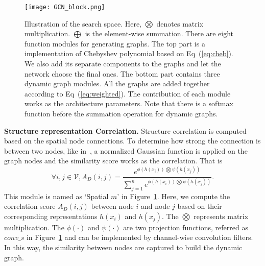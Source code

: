\documentclass[letterpaper]{article} \usepackage{aaai19}  \usepackage{times}  \usepackage{helvet} \usepackage{courier}  \usepackage[hyphens]{url}  \usepackage{graphicx} \urlstyle{rm} \def\UrlFont{\rm}  \usepackage{graphicx}  \frenchspacing  \setlength{\pdfpagewidth}{8.5in}  \setlength{\pdfpageheight}{11in}
\begin{document}
\begin{figure}[thbp!]
\centering
\texttt{[image: GCN\_block.png]}
\caption{\small{ Illustration of the search space. Here, $\bigotimes$ denotes matrix multiplication. $\bigoplus$ is the element-wise summation. There are eight function modules for generating graphs. The top part is a implementation of Chebyshev polynomial based on Eq~(\ref{eq:cheb}). We also add its separate components to the graphs and let the network choose the final ones. The bottom part contains three dynamic graph modules. All the graphs are added together according to Eq~(\ref{eq:weighted}). The contribution of each module works as the architecture parameters. Note that there is a softmax function before the summation operation for dynamic graphs. 
}}
\label{Fig:framework}
\vspace{0.5em}
\end{figure}

\noindent \textbf{Structure representation Correlation.} Structure correlation is computed based on the spatial node connections. To determine how strong the connection is between two nodes, like in~\cite{shi2019two}, a normalized Gaussian function is applied on the graph nodes and the similarity score works as the correlation. That is
\begin{equation}\label{eq:gaussain}
   \forall i,j \in \mathcal{V}, A_{D}(i,j) = \frac{e^{\phi(h(x_i)) \bigotimes  \psi(h(x_j))}}{\sum_{j=1}^{n}e^{\phi(h(x_i)) \bigotimes  \psi(h(x_j))}}.
\end{equation}
This module is named as `Spatial $m$' in Figure~\ref{Fig:framework}. Here, we compute the correlation score $A_{D}(i,j)$ between node $i$ and node $j$ based on their corresponding representations $h(x_i)$ and $h(x_j)$. The $\bigotimes$ represents matrix multiplication. The $\phi(\cdot)$ and $\psi(\cdot)$ are two projection functions, referred as $conv\_s$ in Figure~\ref{Fig:framework} and can be implemented by channel-wise convolution filters. In this way, the similarity between nodes are captured to build the dynamic graph.
\end{document}
